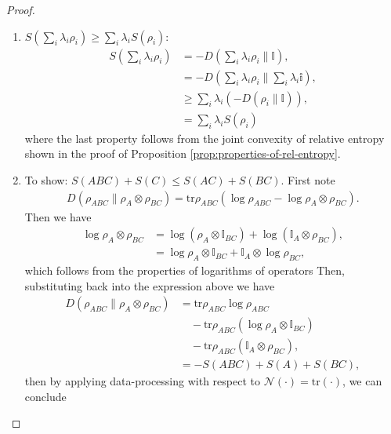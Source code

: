 \documentclass[notoc]{tufte-book}
\begin{document}
\begin{proof}
\begin{enumerate}
    \item $S(\sum_i \lambda_i \rho_i) \geq \sum_i \lambda_i S(\rho_i)$: 
    \begin{align}
        S(\sum_i \lambda_i \rho_i) &=-D(\sum_i \lambda_i \rho_i \| \mathbb{I}),\\
        &= -D(\sum_i \lambda_i \rho_i \| \sum_i \lambda_i \mathbb{i}),\\
        &\geq \sum_i \lambda_i (-D(\rho_i \|\mathbb{I})),\\
        &= \sum_i \lambda_i S(\rho_i)
    \end{align}
    where the last property follows from the joint convexity of relative entropy shown in the proof of Proposition \ref{prop:properties-of-rel-entropy}.
    \item To show: $S(ABC) +S(C) \leq S(AC) + S(BC)$. First note
    \begin{align}
        D(\rho_{ABC} \| \rho_A \otimes \rho_{BC}) = \text{tr}\rho_{ABC}(\log{\rho_{ABC}}-\log{\rho_A \otimes \rho_{BC}}).
    \end{align}
    Then we have
    \begin{align}
        \log{\rho_A \otimes \rho_{BC}} &= \log{(\rho_A \otimes \mathbb{I}_{BC})} + \log{(\mathbb{I}_A \otimes \rho_{BC})},\\
        &= \log{\rho_A} \otimes \mathbb{I}_{BC} + \mathbb{I}_A \otimes \log{\rho_{BC}},
    \end{align}
    which follows from the properties of logarithms of operators
    Then, substituting back into the expression above we have 
    \begin{align}
         D(\rho_{ABC} \| \rho_A \otimes \rho_{BC}) &= \text{tr}\rho_{ABC}\log{\rho_{ABC}}\\
         &\quad- \text{tr}\rho_{ABC}(\log{\rho_A}\otimes \mathbb{I}_{BC})\\
         &\quad -\text{tr}\rho_{ABC}(\mathbb{I}_A\otimes \rho_{BC}),\\
         &=-S(ABC)+S(A)+S(BC),
    \end{align}
    then by applying data-processing with respect to $\mathcal{N}(\cdot) = \text{tr}(\cdot)$, we can conclude

\end{enumerate}
\end{proof}
\end{document}
